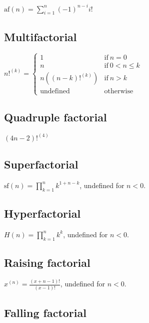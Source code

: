 \( \displaystyle{
    \mbox{af}(n) = \sum_{i = 1}^n {(-1)^{n - i} i!}
}\)


\subsection{Multifactorial}
\label{sec:Multifactorial}

\( \displaystyle{
    n!^{(k)} = \left \lbrace \begin{array}{ll}
      1 & \textrm{if}~ n = 0 \\
      n & \textrm{if}~ 0 < n \le k \\
      n((n - k)!^{(k)}) & \textrm{if}~ n > k \\
      \textrm{undefined} & \textrm{otherwise}
    \end{array} \right .
}\)


\subsection{Quadruple factorial}
\label{sec:Quadruple factorial}

\( \displaystyle{
    (4n - 2)!^{(4)}
}\)


\subsection{Superfactorial}
\label{sec:Superfactorial}

\( \displaystyle{
    \mbox{sf}(n) = \prod_{k = 1}^n k^{1 + n - k}
}\), undefined for $n < 0$.


\subsection{Hyperfactorial}
\label{sec:Hyperfactorial}

\( \displaystyle{
    H(n) = \prod_{k = 1}^n k^k
}\), undefined for $n < 0$.


\subsection{Raising factorial}
\label{sec:Raising factorial}

\( \displaystyle{
    x^{(n)} = \frac{(x + n - 1)!}{(x - 1)!}
}\), undefined for $n < 0$.


\subsection{Falling factorial}
\label{sec:Falling factorial}


